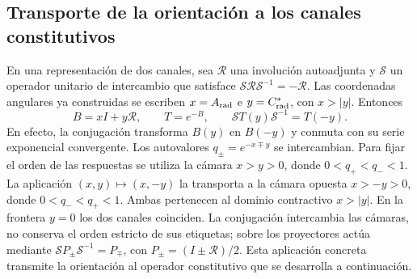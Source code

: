 \subsection{Transporte de la orientación a los canales constitutivos}

En una representación de dos canales, sea $\mathcal R$ una involución
autoadjunta y $\mathcal S$ un operador unitario de intercambio que satisface
$\mathcal S\mathcal R\mathcal S^{-1}=-\mathcal R$. Las coordenadas angulares
ya construidas se escriben $x=A_{\rm rad}$ e $y=C^*_{\rm rad}$, con $x>|y|$.
Entonces
\begin{equation}
 B=xI+y\mathcal R,\qquad T=e^{-B},\qquad
 \mathcal ST(y)\mathcal S^{-1}=T(-y).
 \label{iii:iii:eq:channel-conjugation}
\end{equation}
En efecto, la conjugación transforma $B(y)$ en $B(-y)$ y conmuta con su serie
exponencial convergente. Los autovalores $q_\pm=e^{-x\mp y}$ se intercambian.
Para fijar el orden de las respuestas se utiliza la cámara $x>y>0$, donde
$0<q_+<q_-<1$. La aplicación $(x,y)\mapsto(x,-y)$ la transporta a la
cámara opuesta $x>-y>0$, donde $0<q_-<q_+<1$. Ambas pertenecen al dominio
contractivo $x>|y|$. En la frontera $y=0$ los dos canales coinciden.
La conjugación intercambia las cámaras, no conserva el orden estricto de
sus etiquetas; sobre los proyectores actúa mediante
$\mathcal SP_\pm\mathcal S^{-1}=P_\mp$, con
$P_\pm=(I\pm\mathcal R)/2$.
Esta aplicación concreta transmite la orientación al operador constitutivo que
se desarrolla a continuación.
